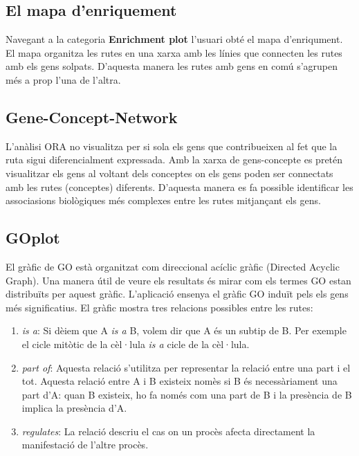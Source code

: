 \subsection{El mapa d'enriquement}

Navegant a la categoria \textbf{Enrichment plot} l'usuari obté el mapa d'enriqument. El mapa organitza les rutes en una xarxa amb les línies que connecten les rutes amb els gens solpats. D'aquesta manera les rutes amb gens en comú s'agrupen més a prop l'una de l'altra.

\subsection{Gene-Concept-Network}

L'anàlisi ORA no visualitza per si sola els gens que contribueixen al fet que la ruta sigui diferencialment expressada. Amb la xarxa de gens-concepte es pretén visualitzar els gens al voltant dels conceptes on els gens poden ser connectats amb les rutes (conceptes) diferents. D'aquesta manera es fa possible identificar les associasions biològiques més complexes entre les rutes mitjançant els gens. 

\subsection{GOplot}

El gràfic de GO està organitzat com direccional acíclic gràfic (Directed Acyclic Graph). Una manera útil de veure els resultats és mirar com els termes GO estan distribuïts per aquest gràfic. L'aplicació ensenya el gràfic GO induït pels els gens més significatius. El gràfic mostra tres relacions possibles entre les rutes: 
\begin{enumerate}
\item \textit{is a}: Si dèiem que A \textit{is a} B, volem dir que A és un subtip de B. Per exemple el cicle mitòtic de la cèl·lula \textit{is a} cicle de la cèl·lula. 
\item \textit{part of}: Aquesta relació s'utilitza per representar la relació entre una part i el tot. Aquesta relació entre A i B existeix nomès si B és necessàriament una part d'A: quan B existeix, ho fa només com una part de B i la presència de B implica la presència d’A.
\item \textit{regulates}: La relació descriu el cas on un procès afecta directament la manifestació de l'altre procès.
\end{enumerate}

